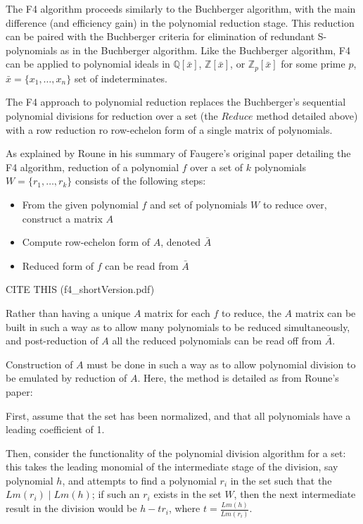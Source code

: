 \documentclass[letterpaper,12pt,titlepage,oneside,final]{book}
\begin{document}
The F4 algorithm proceeds similarly to the Buchberger algorithm, with the main difference (and efficiency gain) in the polynomial reduction stage.  This reduction can be paired with the Buchberger criteria for elimination of redundant S-polynomials as in the Buchberger algorithm.  Like the Buchberger algorithm, F4 can be applied to polynomial ideals in ${\mathbb{Q}[\bar x]}$, ${\mathbb{Z}[\bar x]}$, or ${\mathbb{Z}_p[\bar x]}$ for some prime ${p}$, ${\bar x = \{x_1, \ldots, x_n\}}$ set of indeterminates.   

The F4 approach to polynomial reduction replaces the Buchberger's sequential polynomial divisions for reduction over a set (the ${Reduce}$ method detailed above) with a row reduction ro row-echelon form of a single matrix of polynomials.

As explained by Roune in his summary of Faugere's original paper detailing the F4 algorithm, reduction of a polynomial ${f}$ over a set of ${k}$ polynomials ${W = \{r_1, \ldots, r_k\}}$ consists of the following steps:
\begin{itemize}
  \item From the given polynomial ${f}$ and set of polynomials ${W}$ to reduce over, construct a matrix ${A}$
  \item Compute row-echelon form of ${A}$, denoted ${\bar A}$
  \item Reduced form of ${f}$ can be read from ${\bar A}$
\end{itemize}      
CITE THIS (f4\_shortVersion.pdf)

Rather than having a unique ${A}$ matrix for each ${f}$ to reduce, the ${A}$ matrix can be built in such a way as to allow many polynomials to be reduced simultaneously, and post-reduction of ${A}$ all the reduced polynomials can be read off from ${\bar A}$. 

Construction of ${A}$ must be done in such a way as to allow polynomial division to be emulated by reduction of ${A}$.  Here, the method is detailed as from Roune's paper:

First, assume that the set has been normalized, and that all polynomials have a leading coefficient of 1.  

Then, consider the functionality of the polynomial division algorithm for a set: this takes the leading monomial of the intermediate stage of the division, say polynomial ${h}$, and attempts to find a polynomial ${r_i}$ in the set such that the ${Lm(r_i) \mid Lm(h)}$; if such an ${r_i}$ exists in the set ${W}$, then the next intermediate result in the division would be ${h - tr_i}$, where ${t = \frac{Lm(h)}{Lm(r_i)}}$.  
\end{document}
